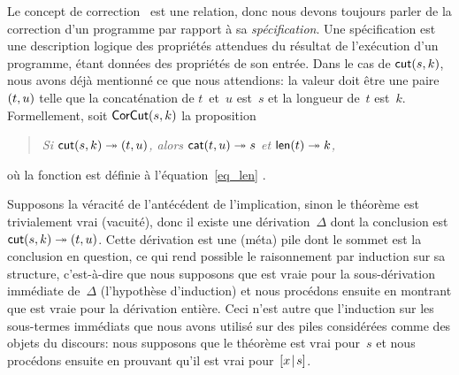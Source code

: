 \label{par_cut_sound}

Le concept de correction~\citep{McCarthy_1962, Floyd_1967, Hoare_1971,
  Dijkstra_1976} est une relation, donc nous devons toujours parler de
la correction d'un programme par rapport à sa
\emph{spécification}. Une spécification est une
description logique des propriétés attendues du résultat de
l'exécution d'un programme, étant données des propriétés de son
entrée. Dans le cas de \(\textsf{cut}(s,k)\), nous avons déjà mentionné
ce que nous attendions: la valeur doit être une paire \(({t},{u})\)
telle que la concaténation de \(t\)~et~\(u\) est~\(s\) et la longueur
de~\(t\) est~\(k\). Formellement, soit
\(\textsf{CorCut}({s,k})\) la
proposition
\begin{quote}
  \textsl{Si \(\textsf{cut}(s,k) \twoheadrightarrow ({t},{u})\), alors
    \(\textsf{cat}(t,u) \twoheadrightarrow s\) et \(\textsf{len}(t)
    \twoheadrightarrow k\),}
\end{quote}
où la fonction  est définie à
l'équation~\eqref{eq_len} .

Supposons la véracité de l'antécédent de l'implication, sinon le
théorème est trivialement vrai (vacuité), donc il existe une
dérivation~\(\Delta\) dont la conclusion est \(\textsf{cut}(s,k)
\twoheadrightarrow ({t},{u})\). Cette dérivation est une (méta) pile
dont le sommet est la conclusion en question, ce qui rend possible le
raisonnement par induction sur sa structure, c'est-à-dire que nous
supposons que  est vraie pour la sous-dérivation
immédiate de~\(\Delta\) (l'hypothèse d'induction) et nous procédons
ensuite en montrant que  est vraie pour la dérivation
entière. Ceci n'est autre que l'induction sur les sous-termes
immédiats que nous avons utilisé sur des piles considérées comme des
objets du discours: nous supposons que le théorème est vrai pour~\(s\)
et nous procédons ensuite en prouvant qu'il est vrai
pour~\([{x}\!\mid\!{s}]\).

